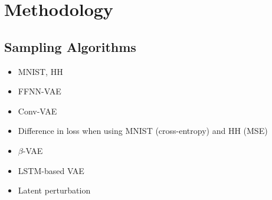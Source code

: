 \section{Methodology}\label{sec:Method}

\subsection{Sampling Algorithms}\label{sec:sampling_algos}

\begin{itemize}
    \item MNIST, HH
    \item FFNN-VAE
    \item Conv-VAE
    \item Difference in loss when using MNIST (cross-entropy) and HH (MSE)
    \item $\beta$-VAE
    \item LSTM-based VAE
    \item Latent perturbation
\end{itemize}

